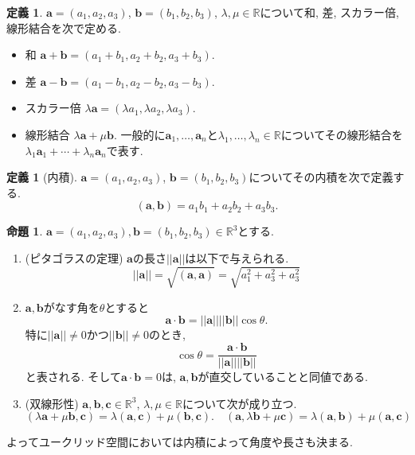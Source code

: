 \documentclass[dvipdfmx,a4paper,11pt]{article}
\newcommand{\R}{\mathbb{R}}
\theoremstyle{definition}
\newtheorem{prop}[thm]{命題}
\newtheorem{dfn}[thm]{定義}
\begin{document}
 
\begin{tcolorbox}[
    colback = white,
    colframe = green!35!black,
    fonttitle = \bfseries,
    breakable = true]
    \begin{dfn}
$\bm{a}= (a_1, a_2, a_3)$, $ \bm{b}=(b_1, b_2, b_3)$, $\lambda, \mu \in \R$について和, 差, スカラー倍, 線形結合を次で定める. 
\begin{itemize}
\setlength{\parskip}{0cm} 
\setlength{\itemsep}{0cm}
\item 和 $\bm{a} + \bm{b} = (a_1 + b_1, a_2 + b_2, a_3 + b_3)$.
\item 差 $\bm{a} - \bm{b} =(a_1 - b_1, a_2 - b_2, a_3 - b_3)$.
\item スカラー倍 $\lambda \bm{a} = (\lambda a_1, \lambda a_2, \lambda a_3)$.
\item 線形結合 $\lambda\bm{a} + \mu\bm{b}$. 一般的に$\bm{a}_1, \ldots, \bm{a}_n$と$\lambda_1, \ldots, \lambda_n \in \R$についてその線形結合を$\lambda_1\bm{a}_1 + \cdots + \lambda_n\bm{a}_n $で表す.
\end{itemize}
    \end{dfn}
 \end{tcolorbox}
 
\begin{tcolorbox}[
    colback = white,
    colframe = green!35!black,
    fonttitle = \bfseries,
    breakable = true]
    \begin{dfn}[内積]
$\bm{a}= (a_1, a_2, a_3)$, 
$ \bm{b}=(b_1, b_2, b_3)$についてその内積を次で定義する. 
$$
(\bm{a}, \bm{b})
=
a_1 b_1 + a_2 b_2 + a_3 b_3.
$$
    \end{dfn}
 \end{tcolorbox}
 
 
\begin{tcolorbox}[
    colback = white,
    colframe = green!35!black,
    fonttitle = \bfseries,
    breakable = true]
    \begin{prop}
$\bm{a} =(a_1, a_2, a_3), \bm{b}=(b_1, b_2, b_3) \in \R^3$とする.
\begin{enumerate}
\setlength{\parskip}{0cm} 
\setlength{\itemsep}{0cm}
\item (ピタゴラスの定理) $\bm{a}$の長さ$||\bm{a}||$は以下で与えられる.
$$
||\bm{a}|| = \sqrt{(\bm{a}, \bm{a})} = \sqrt{a_{1}^{2}+a_{3}^{2}+a_{3}^{2}}
$$
\item $\bm{a}, \bm{b}$がなす角を$\theta$とすると
$$
\bm{a} \cdot\bm{b} = ||\bm{a} || || \bm{b}|| \cos \theta.
$$
特に$||\bm{a} ||  \neq 0$かつ$|| \bm{b}|| \neq0$のとき, 
$$
 \cos \theta  = \frac{\bm{a} \cdot\bm{b}}{||\bm{a} || || \bm{b}||}
$$
と表される. 
そして$\bm{a} \cdot\bm{b} =0$は, $\bm{a}, \bm{b}$が直交していることと同値である.
\item (双線形性) $\bm{a}, \bm{b}, \bm{c} \in \R^3$, $\lambda, \mu \in \R$について次が成り立つ.
$$
(\lambda \bm{a} + \mu \bm{b}, \bm{c})
=\lambda( \bm{a} , \bm{c}) + \mu  (\bm{b}, \bm{c}).
\quad
( \bm{a}, \lambda \bm{b}+ \mu\bm{c})
=
\lambda ( \bm{a}, \bm{b})
+
\mu ( \bm{a}, \bm{c})
$$
\end{enumerate}
よってユークリッド空間においては内積によって角度や長さも決まる. 
    \end{prop}
    \end{tcolorbox}
 
\end{document}
